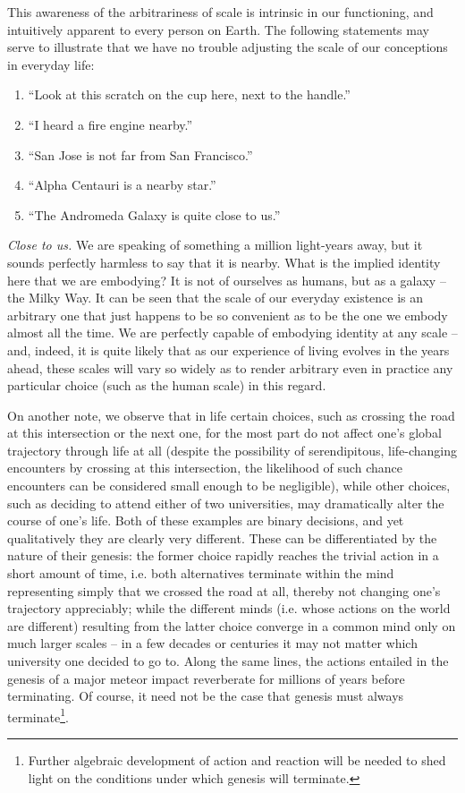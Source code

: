 \documentclass[pra,twocolumn,groupedaddress,10pt]{revtex4}
\theoremstyle{definition}
\begin{document}
This awareness of the arbitrariness of scale is intrinsic in our functioning, and intuitively apparent to every person on Earth. The following statements may serve to illustrate that we have no trouble adjusting the scale of our conceptions in everyday life:

\begin{enumerate}
	\item ``Look at this scratch on the cup here, next to the handle.''
	\item ``I heard a fire engine nearby.''
	\item ``San Jose is not far from San Francisco.''
	\item ``Alpha Centauri is a nearby star.''
	\item ``The Andromeda Galaxy is quite close to us.''
\end{enumerate}

\textit{Close to us.} We are speaking of something a million light-years away, but it sounds perfectly harmless to say that it is nearby. What is the implied identity here that we are embodying? It is not of ourselves as humans, but as a galaxy -- the Milky Way. It can be seen that the scale of our everyday existence is an arbitrary one that just happens to be so convenient as to be the one we embody almost all the time. We are perfectly capable of embodying identity at any scale -- and, indeed, it is quite likely that as our experience of living evolves in the years ahead, these scales will vary so widely as to render arbitrary even in practice any particular choice (such as the human scale) in this regard.

On another note, we observe that in life certain choices, such as crossing the road at this intersection or the next one, for the most part do not affect one's global trajectory through life at all (despite the possibility of serendipitous, life-changing encounters by crossing at this intersection, the likelihood of such chance encounters can be considered small enough to be negligible), while other choices, such as deciding to attend either of two universities, may dramatically alter the course of one's life. Both of these examples are binary decisions, and yet qualitatively they are clearly very different. These can be differentiated by the nature of their genesis: the former choice rapidly reaches the trivial action in a short amount of time, i.e. both alternatives terminate within the mind representing simply that we crossed the road at all, thereby not changing one's trajectory appreciably; while the different minds (i.e. whose actions on the world are different) resulting from the latter choice converge in a common mind only on much larger scales -- in a few decades or centuries it may not matter which university one decided to go to. Along the same lines, the actions entailed in the genesis of a major meteor impact reverberate for millions of years before terminating. Of course, it need not be the case that genesis must always terminate\footnote{Further algebraic development of action and reaction will be needed to shed light on the conditions under which genesis will terminate.}. %
\end{document}
